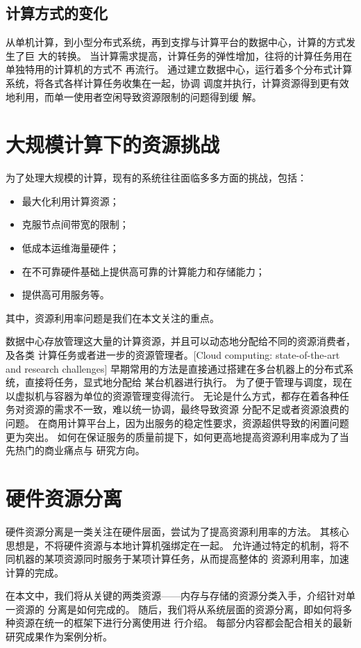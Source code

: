 \subsection{计算方式的变化}

从单机计算，到小型分布式系统，再到支撑与计算平台的数据中心，计算的方式发生了巨
大的转换。
当计算需求提高，计算任务的弹性增加，往将的计算任务用在单独特用的计算机的方式不
再流行。
通过建立数据中心，运行着多个分布式计算系统，将各式各样计算任务收集在一起，协调
调度并执行，计算资源得到更有效地利用，而单一使用者空闲导致资源限制的问题得到缓
解。

\section{大规模计算下的资源挑战}

为了处理大规模的计算，现有的系统往往面临多多方面的挑战，包括：
\begin{itemize}
    \item
    最大化利用计算资源；
    \item
    克服节点间带宽的限制；
    \item 
    低成本运维海量硬件；
    \item
    在不可靠硬件基础上提供高可靠的计算能力和存储能力；
    \item
    提供高可用服务等。
\end{itemize}

其中，资源利用率问题是我们在本文关注的重点。

数据中心存放管理这大量的计算资源，并且可以动态地分配给不同的资源消费者，及各类
计算任务或者进一步的资源管理者。[Cloud computing: state-of-the-art and research challenges]
早期常用的方法是直接通过搭建在多台机器上的分布式系统，直接将任务，显式地分配给
某台机器进行执行。
为了便于管理与调度，现在以虚拟机与容器为单位的资源管理变得流行。
无论是什么方式，都存在着各种任务对资源的需求不一致，难以统一协调，最终导致资源
分配不足或者资源浪费的问题。
在商用计算平台上，因为出服务的稳定性要求，资源超供导致的闲置问题更为突出。
如何在保证服务的质量前提下，如何更高地提高资源利用率成为了当先热门的商业痛点与
研究方向。

\section{硬件资源分离}

硬件资源分离是一类关注在硬件层面，尝试为了提高资源利用率的方法。
其核心思想是，不将硬件资源与本地计算机强绑定在一起。
允许通过特定的机制，将不同机器的某项资源同时服务于某项计算任务，从而提高整体的
资源利用率，加速计算的完成。

在本文中，我们将从关键的两类资源——内存与存储的资源分类入手，介绍针对单一资源的
分离是如何完成的。
随后，我们将从系统层面的资源分离，即如何将多种资源在统一的框架下进行分离使用进
行介绍。
每部分内容都会配合相关的最新研究成果作为案例分析。
